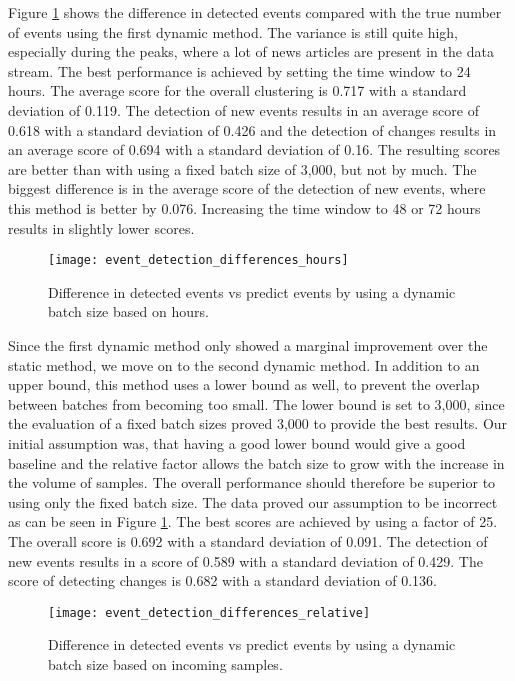 Figure \ref{fig:event_detection_differences_hours} shows the difference in detected events
compared with the true number of events using the first dynamic method.
The variance is still quite high, especially during the peaks,
where a lot of news articles are present in the data stream.
The best performance is achieved by setting the time window to 24 hours.
The average score for the overall clustering is 0.717 with a standard deviation of 0.119.
The detection of new events results in an average score of 0.618 with a standard deviation of 0.426
and the detection of changes results in an average score of 0.694 with a standard deviation of 0.16.
The resulting scores are better than with using a fixed batch size of 3,000, but not by much.
The biggest difference is in the average score of the detection of new events,
where this method is better by 0.076.
Increasing the time window to 48 or 72 hours results in slightly lower scores.

\begin{figure}[h]
    \centering
    \texttt{[image: event\_detection\_differences\_hours]}
    \caption{Difference in detected events vs predict events by using a dynamic batch size based on hours.}
    \label{fig:event_detection_differences_hours}
\end{figure}

Since the first dynamic method only showed a marginal improvement over the static method,
we move on to the second dynamic method.
In addition to an upper bound, this method uses a lower bound as well,
to prevent the overlap between batches from becoming too small.
The lower bound is set to 3,000, since the evaluation of a fixed batch sizes proved 3,000 to provide the best results.
Our initial assumption was, that having a good lower bound
would give a good baseline and the relative factor allows the batch size to grow with the increase in the volume of samples.
The overall performance should therefore be superior to using only the fixed batch size.
The data proved our assumption to be incorrect as can be seen in Figure \ref{fig:event_detection_differences_hours}.
The best scores are achieved by using a factor of 25.
The overall score is 0.692 with a standard deviation of 0.091.
The detection of new events results in a score of 0.589 with a standard deviation of 0.429.
The score of detecting changes is 0.682 with a standard deviation of 0.136.

\begin{figure}[h]
   \centering
   \texttt{[image: event\_detection\_differences\_relative]}
   \caption{Difference in detected events vs predict events by using a dynamic batch size based on incoming samples.}
   \label{fig:event_detection_differences_relative}
\end{figure}

